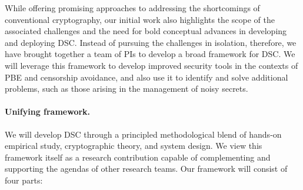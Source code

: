 {While offering promising approaches to addressing the shortcomings of
conventional cryptography, our initial work also highlights the scope of the associated
challenges and the need for bold conceptual advances in developing and
deploying DSC.  Instead of pursuing the challenges in isolation, therefore, we
have brought together a team of PIs to develop a broad framework for DSC. 
We will leverage this framework to develop improved security tools in the
contexts of PBE and censorship avoidance, and also use it to identify and solve
additional problems, such as those arising in the management of noisy
secrets.  


\newpage

\paragraph{Unifying framework.}
We will develop DSC through a principled methodological 
blend of hands-on empirical study, cryptographic theory, and
system design. We view this framework itself as a research contribution capable
of complementing and supporting the agendas of other research teams.  
Our framework will consist of four parts:
\begin{newenum}


\end{newenum}}
